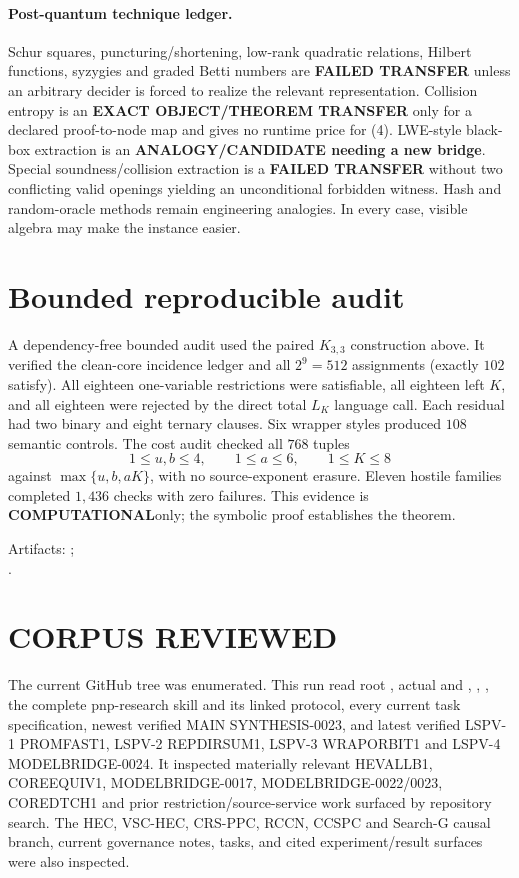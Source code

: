 \documentclass[11pt]{article}
\newcommand{\COMP}{\textbf{COMPUTATIONAL}}
\begin{document}
\paragraph{Post-quantum technique ledger.}
Schur squares, puncturing/shortening, low-rank quadratic relations, Hilbert
functions, syzygies and graded Betti numbers are \textbf{FAILED TRANSFER}
unless an arbitrary decider is forced to realize the relevant representation.
Collision entropy is an \textbf{EXACT OBJECT/THEOREM TRANSFER} only for a
declared proof-to-node map and gives no runtime price for (4).  LWE-style
black-box extraction is an \textbf{ANALOGY/CANDIDATE needing a new bridge}.
Special soundness/collision extraction is a \textbf{FAILED TRANSFER} without
two conflicting valid openings yielding an unconditional forbidden witness.
Hash and random-oracle methods remain engineering analogies.  In every case,
visible algebra may make the instance easier.

\section{Bounded reproducible audit}

A dependency-free bounded audit used the paired \(K_{3,3}\) construction
above.  It verified the clean-core incidence ledger and all \(2^9=512\)
assignments (exactly \(102\) satisfy).  All eighteen one-variable restrictions
were satisfiable, all eighteen left \(K\), and all eighteen were rejected by
the direct total \(L_K\) language call.  Each residual had two binary and
eight ternary clauses.  Six wrapper styles produced \(108\) semantic controls.
The cost audit checked all \(768\) tuples
\[
 1\le u,b\le4,\qquad1\le a\le6,\qquad1\le K\le8
\]
against \(\max\{u,b,aK\}\), with no source-exponent erasure.  Eleven hostile
families completed \(1{,}436\) checks with zero failures.  This evidence is
\COMP only; the symbolic proof establishes the theorem.

Artifacts:
;\\
.

\section{CORPUS REVIEWED}

The current GitHub tree was enumerated.  This run read root
, actual  and ,
, , the complete pnp-research skill and its
linked protocol, every current task specification, newest verified MAIN
SYNTHESIS-0023, and latest verified LSPV-1 PROMFAST1, LSPV-2 REPDIRSUM1,
LSPV-3 WRAPORBIT1 and LSPV-4 MODELBRIDGE-0024.  It inspected materially
relevant HEVALLB1, COREEQUIV1, MODELBRIDGE-0017, MODELBRIDGE-0022/0023,
COREDTCH1 and prior restriction/source-service work surfaced by repository
search.  The HEC, VSC-HEC, CRS-PPC, RCCN, CCSPC and Search-G causal branch,
current governance notes, tasks, and cited experiment/result surfaces were
also inspected.
\end{document}
